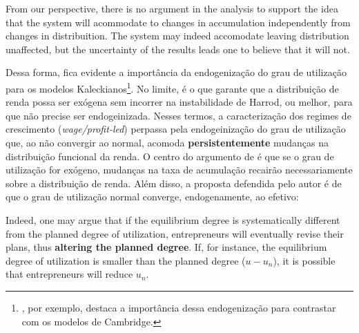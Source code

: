\begin{citacao}
From our perspective, there is no argument in the analysis to support the idea that the system will acommodate to changes in accumulation independently from changes in distribuition. The system may indeed accomodate leaving distribution unaffected, but the uncertainty of the results leads one to believe that it will not. \cite[p. 160]{amadeo_role_1986}
\end{citacao}
Dessa forma, fica evidente a importância da endogenização do grau de utilização para os modelos Kaleckianos\footnote{\textcite[p.~30]{rowthorn_demand_1981}, por exemplo, destaca a importância dessa endogenização para contrastar com os modelos de Cambridge.}. No limite, é o que garante que a distribuição de renda possa ser exógena sem incorrer na instabilidade de Harrod, ou melhor, para que não precise ser endogeinizada. Nesses termos, a caracterização dos regimes de crescimento (\textit{wage/profit-led}) perpassa pela endogeinização do grau de utilização que, ao não convergir ao normal, acomoda  \textbf{persistentemente} mudanças na distribuição funcional da renda.  O centro do argumento de \textcite[p.~155--160]{amadeo_role_1986} é que se o grau de utilização for exógeno, mudanças na taxa de acumulação recairão necessariamente sobre a distribuição de renda. Além disso, a proposta defendida pelo autor é de que o grau de utilização normal converge, endogenamente, ao efetivo:

\begin{citacao}
Indeed, one may argue that if the equilibrium degree is systematically different from
the planned degree of utilization, entrepreneurs will eventually revise their plans,
thus \textbf{altering the planned degree}. If, for instance, the equilibrium degree of utilization is smaller than the planned degree ($u - u_n$), it is possible that entrepreneurs will
reduce $u_n$. \cite[p. 155, grifos adicionados e variáveis adaptadas]{amadeo_role_1986}
\end{citacao}

